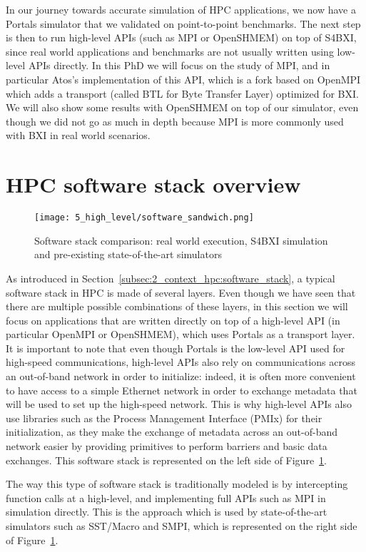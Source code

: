 In our journey towards accurate simulation of HPC applications, we now have a
Portals simulator that we validated on point-to-point benchmarks. The next step
is then to run high-level APIs (such as MPI or OpenSHMEM) on top of S4BXI, since
real world applications and benchmarks are not usually written using low-level
APIs directly. In this PhD we will focus on the study of MPI, and in particular
Atos's implementation of this API, which is a fork based on OpenMPI which adds a
transport (called BTL for Byte Transfer Layer) optimized for BXI. We will also
show some results with OpenSHMEM on top of our simulator, even though we did not
go as much in depth because MPI is more commonly used with BXI in real world
scenarios.

\section{HPC software stack overview}

\begin{figure}[!b]
    \centering
    \texttt{[image: 5\_high\_level/software\_sandwich.png]}
    \caption{Software stack comparison: real world execution, S4BXI simulation and pre-existing state-of-the-art simulators}
    \label{fig:5_high_level:software_sandwich}
\end{figure}

As introduced in Section~\ref{subsec:2_context_hpc:software_stack}, a typical
software stack in HPC is made of several layers. Even though we have seen that
there are multiple possible combinations of these layers, in this section we
will focus on applications that are written directly on top of a high-level API
(in particular OpenMPI or OpenSHMEM), which uses Portals as a transport layer.
It is important to note that even though Portals is the low-level API used for
high-speed communications, high-level APIs also rely on communications across an
out-of-band network in order to initialize: indeed, it is often more convenient
to have access to a simple Ethernet network in order to exchange metadata that
will be used to set up the high-speed network. This is why high-level APIs also
use libraries such as the Process Management Interface (PMIx) for their
initialization, as they make the exchange of metadata across an out-of-band
network easier by providing primitives to perform barriers and basic data
exchanges. This software stack is represented on the left side of
Figure~\ref{fig:5_high_level:software_sandwich}.

The way this type of software stack is traditionally modeled is by intercepting
function calls at a high-level, and implementing full APIs such as MPI in
simulation directly. This is the approach which is used by state-of-the-art
simulators such as SST/Macro and SMPI, which is represented on the right side of
Figure~\ref{fig:5_high_level:software_sandwich}.

